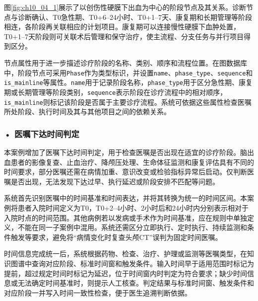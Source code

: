 图\ref{fig:ch10_04_1}展示了以创伤性硬膜下出血为中心的阶段节点及其关系。诊断节点与诊断确认、T0急性期、T0+6--24小时、T0+1--7天、康复期和长期管理等阶段相连，各阶段再关联相应的计划项目。康复期可以连接慢性硬膜下血肿处置，T0+1--7天阶段则可关联术后管理和保守治疗，使主流程、分支任务与并行项目得到区分。

节点属性用于进一步描述诊疗阶段的名称、类别、顺序和流程位置。在图数据库中，阶段节点可采用\texttt{Phase}作为类型标识，并设置\texttt{name}、\texttt{phase\_type}、\texttt{sequence}和\texttt{is\_mainline}等属性。\texttt{name}用于记录阶段名称，\texttt{phase\_type}用于区分急性期、康复期或长期管理等阶段类别，\texttt{sequence}表示阶段在诊疗流程中的相对顺序，\texttt{is\_mainline}则标记该阶段是否属于主要诊疗流程。系统可依据这些属性检查医嘱所处阶段、执行时间及其与其他项目之间的依赖关系。


\par
\vspace{0.8em}
\noindent\begin{minipage}{\textwidth}
\centering
{}
\begingroup
\renewcommand{\thefigure}{10.4-1}
\label{fig:ch10_04_1}
\addtocounter{figure}{-1}
\endgroup
\end{minipage}
\par
\vspace{0.5em}


\subsubsection*{\textbf{• 医嘱下达时间判定}}

本案例增加了医嘱下达时间判定，用于检查医嘱是否出现在适宜的诊疗阶段。脑出血患者的影像复查、止血治疗、降颅压处理、生命体征监测和康复评估具有不同的时间要求，部分医嘱还需在病情加重、意识改变或检验指标异常后启动。仅判断医嘱是否出现，无法发现下达过早、执行延迟或阶段安排不匹配等问题。

系统首先识别医嘱中的时间基准和时间表达，并将其转换为统一的时间区间。本案例将患者入院时间定义为T0，T0+2--4小时、2小时后和24小时内分别表示相对于入院时点的时间范围。其他病例若以发病或手术作为时间基准，应在规则中单独定义，不能在同一子案例中混用。系统还需区分立即执行、定时执行、持续监测和条件触发等要求，避免将“病情变化时复查头颅CT”误判为固定时间医嘱。

时间信息完成统一后，系统根据药物、检查、治疗、护理或监测等医嘱类型，在知识图谱中查询对应阶段、标准时间窗和触发条件。输入时间早于适用范围时标记为提前，超过规定时间时标记为延迟，位于时间窗内时判定为符合要求；缺少时间信息或无法确定时间基准时，则提示人工核查。判定结果与标准时间窗、触发条件和对应阶段一并写入时间一致性检查，便于医生追溯判断依据。


